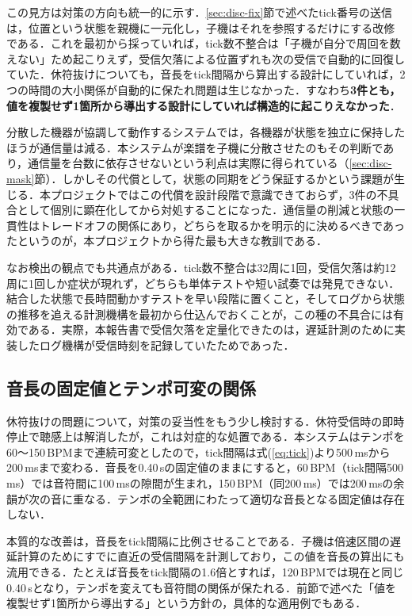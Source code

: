 \documentclass[uplatex,dvipdfmx]{jlreq}
\begin{document}
この見方は対策の方向も統一的に示す．\ref{sec:disc-fix}節で述べたtick番号の送信は，位置という状態を親機に一元化し，子機はそれを参照するだけにする改修である．これを最初から採っていれば，tick数不整合は「子機が自分で周回を数えない」ため起こりえず，受信欠落による位置ずれも次の受信で自動的に回復していた．休符抜けについても，音長をtick間隔から算出する設計にしていれば，2つの時間の大小関係が自動的に保たれ問題は生じなかった．すなわち\textbf{3件とも，値を複製せず1箇所から導出する設計にしていれば構造的に起こりえなかった}．

分散した機器が協調して動作するシステムでは，各機器が状態を独立に保持したほうが通信量は減る．本システムが楽譜を子機に分散させたのもその判断であり，通信量を台数に依存させないという利点は実際に得られている（\ref{sec:disc-mask}節）．しかしその代償として，状態の同期をどう保証するかという課題が生じる．本プロジェクトではこの代償を設計段階で意識できておらず，3件の不具合として個別に顕在化してから対処することになった．通信量の削減と状態の一貫性はトレードオフの関係にあり，どちらを取るかを明示的に決めるべきであったというのが，本プロジェクトから得た最も大きな教訓である．

なお検出の観点でも共通点がある．tick数不整合は32周に1回，受信欠落は約12周に1回しか症状が現れず，どちらも単体テストや短い試奏では発見できない．結合した状態で長時間動かすテストを早い段階に置くこと，そしてログから状態の推移を追える計測機構を最初から仕込んでおくことが，この種の不具合には有効である．実際，本報告書で受信欠落を定量化できたのは，遅延計測のために実装したログ機構が受信時刻を記録していたためであった．

\subsection{音長の固定値とテンポ可変の関係}

休符抜けの問題について，対策の妥当性をもう少し検討する．休符受信時の即時停止で聴感上は解消したが，これは対症的な処置である．本システムはテンポを60〜150\,BPMまで連続可変としたので，tick間隔は式(\ref{eq:tick})より500\,msから200\,msまで変わる．音長を0.40\,sの固定値のままにすると，60\,BPM（tick間隔500\,ms）では音符間に100\,msの隙間が生まれ，150\,BPM（同200\,ms）では200\,msの余韻が次の音に重なる．テンポの全範囲にわたって適切な音長となる固定値は存在しない．

本質的な改善は，音長をtick間隔に比例させることである．子機は倍速区間の遅延計算のためにすでに直近の受信間隔を計測しており，この値を音長の算出にも流用できる．たとえば音長をtick間隔の1.6倍とすれば，120\,BPMでは現在と同じ0.40\,sとなり，テンポを変えても音符間の関係が保たれる．前節で述べた「値を複製せず1箇所から導出する」という方針の，具体的な適用例でもある．
\end{document}
